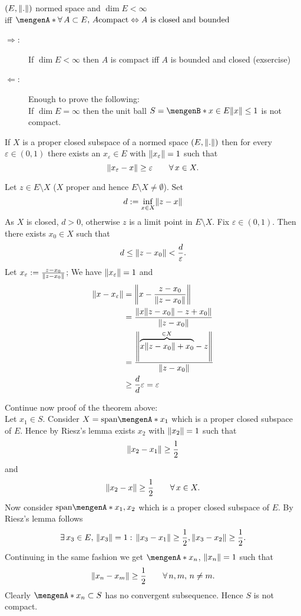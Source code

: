 \begin{theorem*}
	$(E,\norm{.})$ normed space and $\dim E < \infty$ \\ iff $\set{\forall\, A \subset E,\,A \text{compact} \Leftrightarrow A \text{ is closed and bounded}}$
\end{theorem*}
\begin{beweis}
	\begin{description}
		\item[$\Rightarrow$:]If $\dim E < \infty$ then $A$ is compact iff $A$ is bounded and closed (exsercise)
		\item[$\Leftarrow$:]Enough to prove the following: \\
		If $\dim E = \infty$ then the unit ball $S = \set[x \in E]{\norm{x}\leq 1}$ is not compact.
	\end{description}
\begin{lemma*}
	If $X$ is a proper closed subspace of a normed space $(E,\norm{.})$ then for every $\varepsilon \in (0,1)$ there exists an $x_{\varepsilon} \in E$ with $\norm{x_\varepsilon}=1$ such that
	\[
		\norm{x_{\varepsilon}-x} \geq \varepsilon \qquad \forall\, x \in X.
	\]
\end{lemma*}
\begin{beweis}
	Let $z \in E \setminus X$ ($X$ proper and hence $E \setminus X \neq \emptyset$). Set 
	\[
		d:= \inf_{x \in X}\norm{z-x}
	\] As $X$ is closed, $d >0$, otherwise $z$ is a limit point in $E \setminus X$. Fix $\varepsilon \in (0,1)$. Then there exists $x_0 \in X$ such that
	\[
		d \leq \norm{z-x_0} < \frac{d}{\varepsilon}.
	\]
	Let $x_\varepsilon := \frac{z-x_0}{\norm{z-x_0}}$; We have $\norm{x_\varepsilon}=1$ and
	\begin{align*}
		\norm{x- x_\varepsilon} &= \norm{x - \frac{z-x_0}{\norm{z-x_0}}} \\
		&= \frac{\norm{x \norm{z-x_0}-z + x_0}}{\norm{z-x_0}} \\
		&= \frac{\norm{\overset{\in X}{\overbrace{x \norm{z-x_0}+ x_0 }}- z}}{\norm{z-x_0}} \\
		&\geq \frac{d}{d}\varepsilon = \varepsilon
	\end{align*}
\end{beweis}
Continue now proof of the theorem above: \\
Let $x_1 \in S$. Consider $X = \text{span} \set{x_1}$ which is a proper closed subspace of $E$. Hence by Riesz's lemma exists $x_2$ with $\norm{x_2}=1$ such that
\[
	\norm{x_2-x_1} \geq \frac{1}{2} 
\]
and
\[
	\norm{x_2-x} \geq \frac{1}{2} \qquad \forall\, x \in X.
\]
Now consider $\text{span} \set{x_1,x_2}$ which is a proper closed subspace of $E$. By Riesz's lemma follows
\[
	\exists\,x_3 \in E,\, \norm{x_3}=1: \, \norm{x_3-x_1}\geq \frac{1}{2}, \norm{x_3-x_2} \geq \frac{1}{2}.
\]
Continuing in the same fashion we get $\set{x_n}$, $\norm{x_n}=1$ such that 
\[
	\norm{x_n-x_m} \geq \frac{1}{2} \qquad \forall\, n,m,\,n \neq m.
\]
Clearly $\set{x_n} \subset S$ has no convergent subsequence. Hence $S$ is not compact.
\end{beweis}
